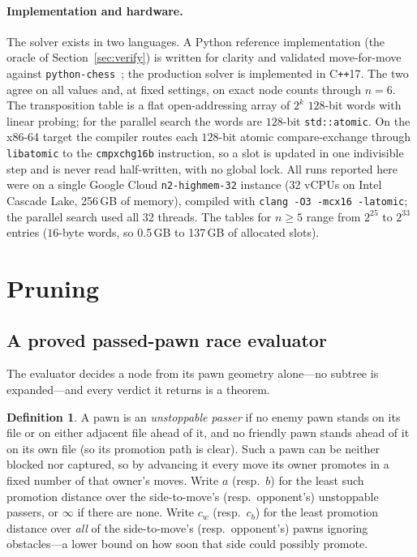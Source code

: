 \documentclass[Afour,sageapa,times]{sagej}
\theoremstyle{plain}
\theoremstyle{definition}
\newtheorem{definition}{Definition}
\begin{document}
\paragraph{Implementation and hardware.} The solver exists in two languages. A
Python reference implementation (the oracle of Section~\ref{sec:verify}) is
written for clarity and validated move-for-move against
\texttt{python-chess}~\cite{pythonchess}; the production solver is implemented in
C\texttt{++}17. The two agree on all values and, at fixed
settings, on exact node counts through $n=6$. The transposition table is a flat
open-addressing array of $2^{k}$ $128$-bit words with linear probing; for the
parallel search the words are $128$-bit \texttt{std::atomic}. On the x86-64 target
the compiler routes each $128$-bit atomic compare-exchange through
\texttt{libatomic} to the \texttt{cmpxchg16b} instruction, so a slot is updated in
one indivisible step and is never read half-written, with no global lock. All runs
reported here were on a single Google Cloud \texttt{n2-highmem-32} instance
(32 vCPUs on Intel Cascade Lake, 256\,GB of memory), compiled with
\texttt{clang -O3 -mcx16 -latomic}; the parallel search used all 32 threads. The
tables for $n\ge5$ range from $2^{25}$ to $2^{33}$ entries ($16$-byte words, so
0.5\,GB to 137\,GB of allocated slots).

\section{Pruning}\label{sec:pruning}

\subsection{A proved passed-pawn race evaluator}\label{sec:race}

The evaluator decides a node from its pawn geometry alone---no subtree is
expanded---and every verdict it returns is a theorem.

\begin{definition}
A pawn is an \emph{unstoppable passer} if no enemy pawn stands on its file or on
either adjacent file ahead of it, and no friendly pawn stands ahead of it on its own
file (so its promotion path is clear). Such a pawn can be neither blocked nor
captured, so by advancing it every move its owner promotes in a fixed number of
that owner's moves. Write $a$ (resp.\ $b$) for the least such promotion distance
over the side-to-move's (resp.\ opponent's) unstoppable passers, or $\infty$ if
there are none. Write $c_w$ (resp.\ $c_b$) for the least promotion distance over
\emph{all} of the side-to-move's (resp.\ opponent's) pawns ignoring obstacles---a
lower bound on how soon that side could possibly promote.
\end{definition}
\end{document}
